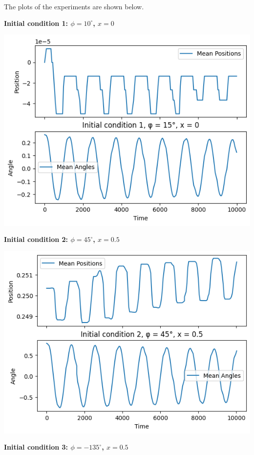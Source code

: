 \documentclass{article}
\begin{document}
The plots of the experiments are shown below.

\textbf{Initial condition 1: $\phi = 10^\circ$, $x = 0$}

\includegraphics*[scale=0.5]{graphics/init_1.png}

\textbf{Initial condition 2: $\phi = 45^\circ$, $x = 0.5$}

\includegraphics*[scale=0.5]{graphics/init_2.png}

\textbf{Initial condition 3: $\phi = -135^\circ$, $x = 0.5$}
\end{document}
